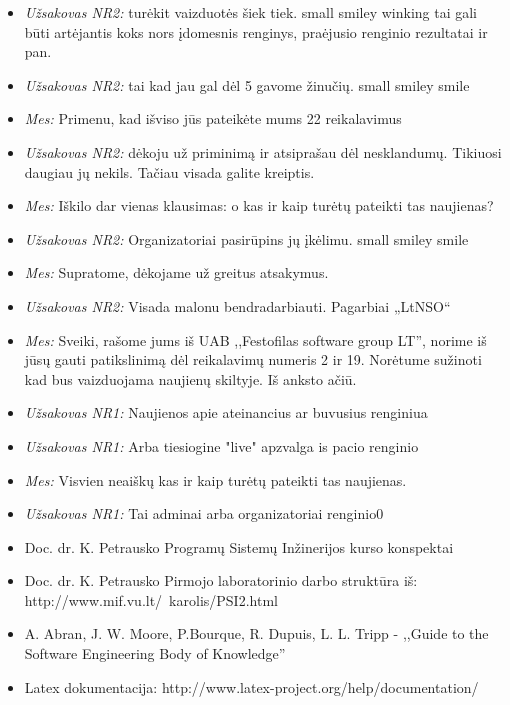 \documentclass{VUMIFPSkursinis}
\begin{document}
\begin{itemize}
\begin{itemize}
					\item \textit{Užsakovas NR2:} turėkit vaizduotės šiek tiek. small smiley winking tai gali būti artėjantis koks nors įdomesnis renginys, praėjusio renginio rezultatai ir pan.
					\item \textit{Užsakovas NR2:} tai kad jau gal dėl 5 gavome žinučių. small smiley smile
					\item \textit{Mes:} Primenu, kad išviso jūs pateikėte mums 22 reikalavimus
					\item \textit{Užsakovas NR2:} dėkoju už priminimą ir atsiprašau dėl nesklandumų. Tikiuosi daugiau jų nekils. Tačiau visada galite kreiptis.
					\item \textit{Mes:} Iškilo dar vienas klausimas: o kas ir kaip turėtų pateikti tas naujienas?
					\item \textit{Užsakovas NR2:} Organizatoriai pasirūpins jų įkėlimu. small smiley smile
					\item \textit{Mes:} Supratome, dėkojame už greitus atsakymus.
					\item \textit{Užsakovas NR2:} Visada malonu bendradarbiauti. Pagarbiai „LtNSO“
					
					\item \textit{Mes:} Sveiki, rašome jums iš UAB ,,Festofilas software group LT'', norime iš jūsų gauti patikslinimą dėl reikalavimų numeris 2 ir 19. Norėtume sužinoti kad bus vaizduojama naujienų skiltyje. Iš anksto ačiū.
					\item \textit{Užsakovas NR1:} Naujienos apie ateinancius ar buvusius renginiua
					\item \textit{Užsakovas NR1:} Arba tiesiogine "live" apzvalga is pacio renginio
					\item \textit{Mes:} Visvien neaiškų kas ir kaip turėtų pateikti tas naujienas.
					\item \textit{Užsakovas NR1:} Tai adminai arba organizatoriai renginio0
				\end{itemize}
        \end{itemize}
     \label{literaturosSarasas}
        \begin{itemize}
			\item Doc. dr. K. Petrausko Programų Sistemų Inžinerijos kurso konspektai
			\item Doc. dr. K. Petrausko Pirmojo laboratorinio darbo struktūra iš: http://www.mif.vu.lt/~karolis/PSI2.html
			\item A. Abran, J. W. Moore, P.Bourque, R. Dupuis, L. L. Tripp - ,,Guide to the Software Engineering Body of Knowledge''
			\item Latex dokumentacija: http://www.latex-project.org/help/documentation/
        \end{itemize}
\end{document}
